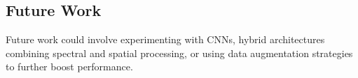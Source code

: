\documentclass[fleqn,moreauthors,10pt]{ds_report}
\begin{document}
\subsection{Future Work}
Future work could involve experimenting with CNNs, hybrid architectures combining spectral and spatial processing, or using data augmentation strategies to further boost performance.







%
%
\end{document}
